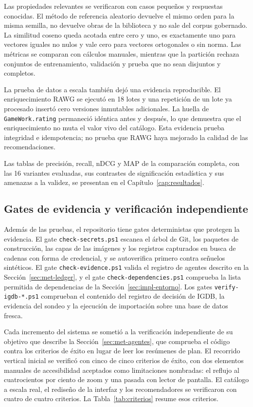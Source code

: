 Las propiedades relevantes se verificaron con casos pequeños y respuestas conocidas. El
método de referencia aleatorio devuelve el mismo orden para la misma semilla, no devuelve obras de la
biblioteca y no sale del corpus gobernado. La similitud coseno queda acotada entre cero y
uno, es exactamente uno para vectores iguales no nulos y vale cero para vectores ortogonales
o sin norma. Las métricas se comparan con cálculos manuales, mientras que la partición rechaza
conjuntos de entrenamiento, validación y prueba que no sean disjuntos y completos.

La prueba de datos a escala también dejó una evidencia reproducible. El enriquecimiento RAWG
se ejecutó en 18 lotes y una repetición de un lote ya procesado insertó cero versiones inmutables
adicionales. La huella de \texttt{GameWork.rating} permaneció idéntica antes y después, lo
que demuestra que el enriquecimiento no muta el valor vivo del catálogo. Esta evidencia
prueba integridad e idempotencia; no prueba que RAWG haya mejorado la calidad de las
recomendaciones.

Las tablas de precisión, recall, nDCG y MAP de la comparación completa, con las 16 variantes evaluadas, sus contrastes de significación estadística y sus amenazas a la validez, se presentan en el Capítulo~\ref{cap:resultados}.

\subsection{Gates de evidencia y verificación independiente}\label{sec:pru-gates}\label{sec:pru-verificacion-fase}

Además de las pruebas, el repositorio tiene gates deterministas que protegen la evidencia. El
gate \texttt{check-secrets.ps1} escanea el árbol de Git, los paquetes de construcción, las
capas de las imágenes y los registros capturados en busca de cadenas con forma de credencial,
y se autoverifica primero contra señuelos sintéticos. El gate \texttt{check-evidence.ps1}
valida el registro de agentes descrito en la Sección~\ref{sec:met-ledger}, y el gate
\texttt{check-dependencies.ps1} comprueba la lista permitida de dependencias de la
Sección~\ref{sec:impl-entorno}. Los gates \texttt{verify-igdb-*.ps1} comprueban el contenido del
registro de decisión de IGDB, la evidencia del sondeo y la ejecución de importación sobre una
base de datos fresca.

Cada incremento del sistema se sometió a la verificación independiente de su objetivo que
describe la Sección~\ref{sec:met-agentes}, que comprueba el código contra los criterios de
éxito en lugar de leer los resúmenes de plan. El recorrido vertical
inicial se verificó con cinco de cinco criterios de éxito, con dos elementos manuales de
accesibilidad aceptados como limitaciones nombradas: el reflujo al cuatrocientos por ciento
de zoom y una pasada con lector de pantalla. El catálogo a escala real, el rediseño de la
interfaz y los recomendadores se verificaron con cuatro de cuatro criterios. La Tabla~\ref{tab:criterios} resume esos criterios.

